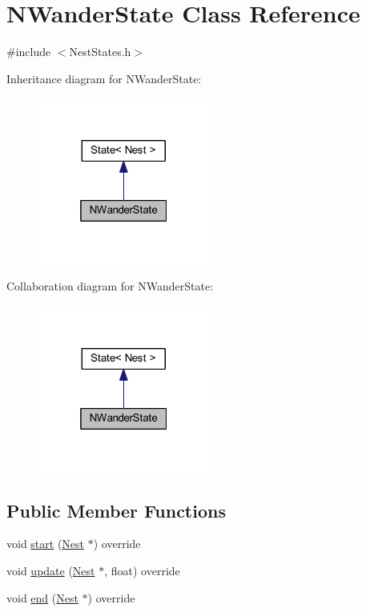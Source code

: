 \hypertarget{class_n_wander_state}{}\section{N\+Wander\+State Class Reference}
\label{class_n_wander_state}


{\ttfamily \#include $<$Nest\+States.\+h$>$}



Inheritance diagram for N\+Wander\+State\+:\nopagebreak
\begin{figure}[H]
\begin{center}
\leavevmode
\includegraphics[width=160pt]{class_n_wander_state__inherit__graph}
\end{center}
\end{figure}


Collaboration diagram for N\+Wander\+State\+:\nopagebreak
\begin{figure}[H]
\begin{center}
\leavevmode
\includegraphics[width=160pt]{class_n_wander_state__coll__graph}
\end{center}
\end{figure}
\subsection*{Public Member Functions}
\begin{DoxyCompactItemize}
\item 
void \hyperlink{class_n_wander_state_a8f0f059e756935283e903fa4647a7c3d}{start} (\hyperlink{class_nest}{Nest} $\ast$) override
\item 
void \hyperlink{class_n_wander_state_aa6245a3229ba7f0231e4d2bad59a0789}{update} (\hyperlink{class_nest}{Nest} $\ast$, float) override
\item 
void \hyperlink{class_n_wander_state_acfff1d26985924da7d3c540a9399dd1d}{end} (\hyperlink{class_nest}{Nest} $\ast$) override
\end{DoxyCompactItemize}
